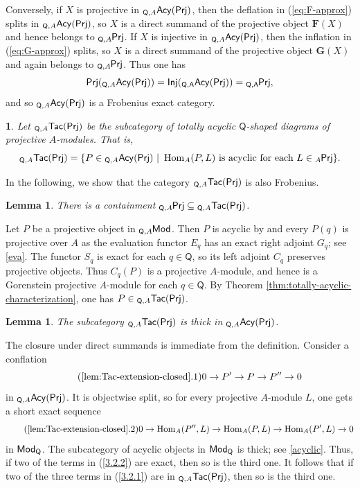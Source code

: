 \documentclass{amsart}
\theoremstyle{bfupright head,slanted body}
\theoremstyle{bfupright head,upright body}
\theoremstyle{fixed bf head,slanted body}
\newtheorem{lem}[res]{Lemma}            \newtheorem*{lem*}{Lemma}
\theoremstyle{fixed bf head,upright body}
\theoremstyle{numbered paragraph}
\newtheorem{ipg}[res]{}
\newenvironment{prf*}[1][Proof]{%
	\begin{proof}[\bf #1]
		\setcounter{equation}{0}
		\renewcommand{\theequation}{\arabic{equation}}}
	{\end{proof}
}
\numberwithin{equation}{res}
\newcommand{\TacQ}{{}_{\Q,A}\mathsf{Tac}(\sf Prj)}
\newcommand{\AcQ}{{}_{\Q,A}\mathsf{Acy}(\sf Prj)}
\newcommand{\Prj}[1]{\mathsf{Prj}(#1)}
\newcommand{\Inj}[1]{\mathsf{Inj}(#1)}
\newcommand{\Hom}{\operatorname{Hom}}
\newcommand{\Q}{\mathsf{Q}}
\newcommand{\lMod}[1]{{}_{#1}\mspace{-1mu}{\sf{Mod}}}
\newcommand{\lPrj}[1]{{}_{#1}\mspace{-1mu}{\sf{Prj}}}
\newcommand{\rMod}[1]{{\sf{Mod}}_{#1}}
\begin{document}
\begin{prf*}
Conversely, if $X$ is projective in $\AcQ$, then the deflation in (\ref{eq:F-approx}) splits in $\AcQ$, so $X$ is a direct summand of the projective object $\mathbf F(X)$ and hence belongs to $\lPrj{\Q,A}$. If $X$ is injective in $\AcQ$, then the inflation in (\ref{eq:G-approx}) splits, so $X$ is a direct summand of the projective object $\mathbf G(X)$ and again belongs to $\lPrj{\Q,A}$. Thus one has
$$\Prj{\AcQ}=\Inj{\AcQ}=\lPrj{\Q,A},$$
and so $\AcQ$ is a Frobenius exact category.
\end{prf*}

\begin{ipg}
Let ${\TacQ}$ be the subcategory of totally acyclic $\Q$-shaped diagrams of projective $A$-modules. That is,
$${\TacQ}=\{P\in{\AcQ}\ |\ \Hom_A(P,L) \text{ is acyclic for each }L\in\lPrj A\}.$$
\end{ipg}

In the following, we show that the category $\TacQ$ is also Frobenius.

\begin{lem}\label{lem:projectives-in-Tac}
There is a containment $\lPrj{\Q,A}\subseteq\TacQ$.
\end{lem}

\begin{prf*}
Let $P$ be a projective object in $\lMod{\Q,A}$. Then $P$ is acyclic by \cite[Theorems 7.1 and 7.29]{HJ22} and every $P(q)$ is projective over $A$ as the evaluation functor $E_q$ has an exact right adjoint $G_q$; see \ref{eva}. The functor $S_q$ is exact for each $q\in\Q$, so its left adjoint $C_q$ preserves projective objects. Thus $C_q(P)$ is a projective $A$-module, and hence is a Gorenstein projective $A$-module for each $q\in\Q$. By Theorem \ref{thm:totally-acyclic-characterization}, one has $P\in\TacQ$.
\end{prf*}

\begin{lem}\label{lem:Tac-extension-closed}
The subcategory $\TacQ$ is thick in $\AcQ$.
\end{lem}

\begin{prf*}
The closure under direct summands is immediate from the definition. Consider a conflation
\begin{equation}\tag{\ref{lem:Tac-extension-closed}.1}\label{3.2.1}
0\to P'\to P\to P''\to 0
\end{equation}
in $\AcQ$. It is objectwise split, so for every projective $A$-module $L$, one gets a short exact sequence
\begin{equation}\tag{\ref{lem:Tac-extension-closed}.2}\label{3.2.2}
0\to\Hom_A(P'',L)\to\Hom_A(P,L)\to\Hom_A(P',L)\to 0
\end{equation}
in $\rMod{\Q}$. The subcategory of acyclic objects in $\rMod{\Q}$ is thick; see \ref{acyclic}. Thus, if two of the terms in (\ref{3.2.2}) are exact, then so is the third one. It follows that if two of the three terms in (\ref{3.2.1}) are in $\TacQ$, then so is the third one.
\end{prf*}
\end{document}
